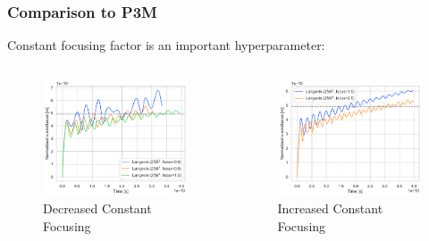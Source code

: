 \documentclass[.08pt,aspectratio=169]{beamer}
\begin{document}
\begin{frame}
    \frametitle{Comparison to P3M}

     \item Constant focusing factor is an important hyperparameter:
     \begin{columns}

\begin{figure}[!htb]
  \includegraphics[width=0.9\linewidth]{figures/comparison_low_focus.pdf}
    \caption{Decreased Constant Focusing} 
  \label{fig:awesome_image5}
\end{figure}

\begin{figure}[!htb]
  \includegraphics[width=0.9\linewidth]{figures/comparison_high_focus.pdf}
    \caption{Increased Constant Focusing} 
  \label{fig:awesome_image6}
\end{figure}

     \end{columns}

\end{frame}
\end{document}
